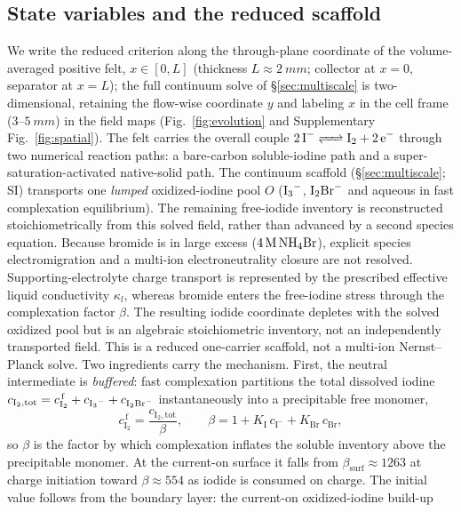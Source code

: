 \documentclass[11pt]{article}
\newcommand{\ci}{c_{\mathrm{I^-}}}
\newcommand{\cf}{c_{\mathrm{I_2}}^{\,\mathrm{f}}}
\begin{document}
\subsection{State variables and the reduced scaffold}
\label{sec:gov}
We write the reduced criterion along the through-plane coordinate of the volume-averaged positive felt,
$x\in[0,L]$ (thickness $L\!\approx\!\SI{2}{mm}$; collector at $x=0$, separator at $x=L$); the full continuum
solve of \S\ref{sec:multiscale} is two-dimensional, retaining the flow-wise coordinate $y$ and labeling $x$ in
the cell frame ($3$--$\SI{5}{mm}$) in the field maps (Fig.~\ref{fig:evolution} and Supplementary Fig.~\ref{fig:spatial}). The felt
carries the overall couple $\ce{2 I^- <=> I2 + 2 e^-}$ through two numerical reaction paths: a
bare-carbon soluble-iodine path and a super-saturation-activated native-solid path. The continuum scaffold
(\S\ref{sec:multiscale}; SI) transports one \emph{lumped} oxidized-iodine pool $O$
($\ce{I3^-}$, $\ce{I2Br^-}$ and aqueous  in fast complexation equilibrium). The remaining free-iodide
inventory is reconstructed stoichiometrically from this solved field, rather than advanced by a second species
equation. Because bromide is in large excess
($4\,\mathrm{M}\,\ce{NH4Br}$), explicit species electromigration and a multi-ion electroneutrality closure are
not resolved. Supporting-electrolyte charge transport is represented by the prescribed effective liquid
conductivity $\kappa_l$, whereas bromide enters the free-iodine stress through the complexation
factor $\beta$. The resulting iodide coordinate depletes with the solved oxidized pool but is an algebraic
stoichiometric inventory, not an independently transported field. This is a reduced one-carrier scaffold, not
a multi-ion Nernst--Planck solve. Two ingredients carry the mechanism. First, the neutral intermediate is
\emph{buffered}: fast complexation partitions the total dissolved iodine
$c_{\mathrm{I_2,tot}}=\cf+c_{\ce{I3^-}}+c_{\ce{I2Br^-}}$ instantaneously into a precipitable free monomer,
\begin{equation}
\cf=\frac{c_{\mathrm{I_2,tot}}}{\beta},\qquad
\beta=1+K_{\mathrm I}\,\ci+K_{\mathrm{Br}}\,c_{\mathrm{Br}},
\label{eq:beta}
\end{equation}
so $\beta$ is the factor by which complexation inflates the soluble inventory above the precipitable
monomer. At the current-on surface it falls from $\beta_{\mathrm{surf}}\!\approx\!1263$ at charge initiation toward
$\beta\!\approx\!554$ as iodide is
consumed on charge. The initial value follows from the boundary layer: the current-on oxidized-iodine build-up
\end{document}
